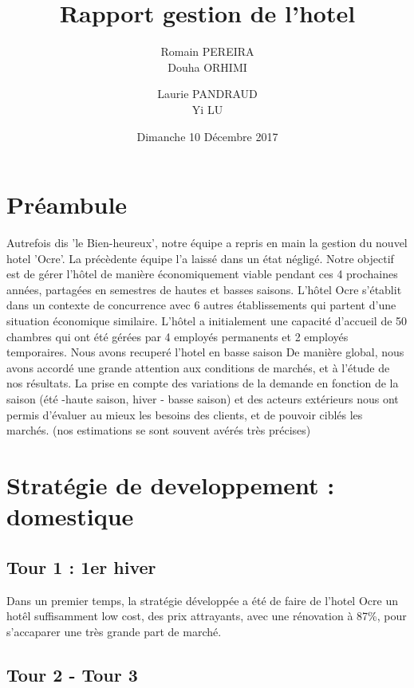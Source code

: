 \documentclass[a4paper,10pt]{article}
\title{Rapport gestion de l'hotel}
\author{
  Romain PEREIRA\\
  \newline
  Douha ORHIMI\\
  \and
  Laurie PANDRAUD\\
  \newline
  Yi LU\\
}
\date{Dimanche 10 Décembre 2017}
\begin{document}
\maketitle
\tableofcontents
  \section{Préambule}
    Autrefois dis 'le Bien-heureux', notre équipe a repris en main la gestion du nouvel hotel 'Ocre'. La précèdente équipe l'a laissé dans un état négligé.
    Notre objectif est de gérer l'hôtel de manière économiquement viable pendant ces 4 prochaines années, partagées en semestres de hautes et basses saisons.
    \newline
    \newline
    L’hôtel Ocre s’établit dans un contexte de concurrence avec 6 autres établissements qui partent d’une situation économique similaire.
    L’hôtel a initialement une capacité d’accueil de 50 chambres qui ont été gérées par 4 employés permanents et 2 employés temporaires.
    Nous avons recuperé l'hotel en basse saison
    \newline
    \newline
    De manière global, nous avons accordé une grande attention aux conditions de marchés, et à l'étude de nos résultats.
    La prise en compte des variations de la demande en fonction de la saison
    (été -haute saison, hiver - basse saison) et des acteurs extérieurs nous ont permis d’évaluer
    au mieux les besoins des clients, et de pouvoir ciblés les marchés. (nos estimations se sont souvent avérés très précises)
  \newpage
  \section{Stratégie de developpement : domestique}
    \subsection{Tour 1 : 1er hiver}      
      Dans un premier temps, la stratégie développée a été de faire de l’hotel Ocre un hotêl suffisamment low cost,
      des prix attrayants, avec une rénovation à 87\%, pour s’accaparer une très grande part de marché.

    \subsection{Tour 2 - Tour 3}
    
\end{document}
